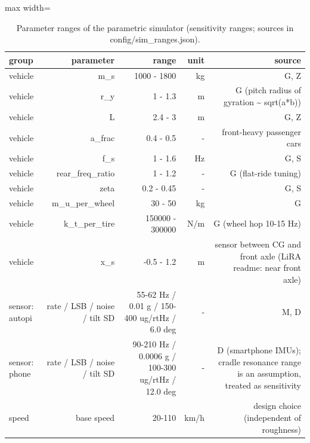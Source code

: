 \begin{table}[!htbp]
\centering
\footnotesize
\caption{Parameter ranges of the parametric simulator (sensitivity ranges; sources in config/sim\_ranges.json).}
\label{tab:simranges}
\begin{adjustbox}{max width=\columnwidth}
\begin{tabular}{lrrrr}
\toprule
\textbf{group} & \textbf{parameter} & \textbf{range} & \textbf{unit} & \textbf{source} \\
\midrule
vehicle & m\_s & 1000 - 1800 & kg & G, Z \\
vehicle & r\_y & 1 - 1.3 & m & G (pitch radius of gyration \textasciitilde{} sqrt(a*b)) \\
vehicle & L & 2.4 - 3 & m & G, Z \\
vehicle & a\_frac & 0.4 - 0.5 & - & front-heavy passenger cars \\
vehicle & f\_s & 1 - 1.6 & Hz & G, S \\
vehicle & rear\_freq\_ratio & 1 - 1.2 & - & G (flat-ride tuning) \\
vehicle & zeta & 0.2 - 0.45 & - & G, S \\
vehicle & m\_u\_per\_wheel & 30 - 50 & kg & G \\
vehicle & k\_t\_per\_tire & 150000 - 300000 & N/m & G (wheel hop 10-15 Hz) \\
vehicle & x\_s & -0.5 - 1.2 & m & sensor between CG and front axle (LiRA readme: near front axle) \\
sensor: autopi & rate / LSB / noise / tilt SD & 55-62 Hz / 0.01 g / 150-400 ug/rtHz / 6.0 deg & - & M, D \\
sensor: phone & rate / LSB / noise / tilt SD & 90-210 Hz / 0.0006 g / 100-300 ug/rtHz / 12.0 deg & - & D (smartphone IMUs); cradle resonance range is an assumption, treated as sensitivity \\
speed & base speed & 20-110 & km/h & design choice (independent of roughness) \\
\bottomrule
\end{tabular}
\end{adjustbox}
\end{table}

